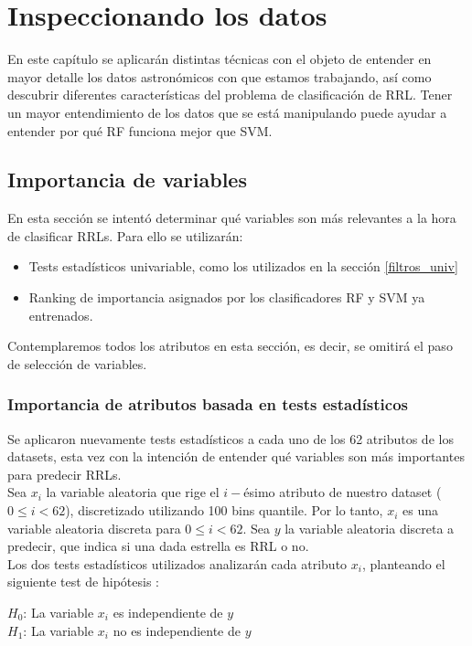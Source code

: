 \chapter{Inspeccionando los datos}
\label{inspeccionando}
En este capítulo se aplicarán distintas técnicas con el objeto de entender en mayor detalle los datos astronómicos con que estamos trabajando, así como descubrir diferentes características del problema de clasificación de RRL. Tener un mayor entendimiento de los datos que se está manipulando puede ayudar a entender por qué RF funciona mejor que SVM.

\section{Importancia de variables}

En esta sección se intentó determinar qué variables son más relevantes a la hora de clasificar RRLs. Para ello se utilizarán:
\begin{itemize}
\item Tests estadísticos univariable, como los utilizados en la sección \ref{filtros_univ}
\item Ranking de importancia asignados por los clasificadores RF y SVM ya entrenados.
\end{itemize} 

Contemplaremos todos los atributos en esta sección, es decir, se omitirá el paso de selección de variables.

\subsection{Importancia de atributos basada en tests estadísticos}
Se aplicaron nuevamente tests estadísticos a cada uno de los 62 atributos de los datasets, esta vez con la intención de entender qué variables son más importantes para predecir RRLs.\\

Sea $x_i$ la variable aleatoria que rige el $i-$ésimo atributo de nuestro dataset ($0 \leq i < 62$), discretizado utilizando 100 bins quantile. Por lo tanto, $x_i$ es una variable aleatoria discreta para $0 \leq i < 62$. Sea $y$ la variable aleatoria discreta a predecir, que indica si una dada estrella es RRL o no. \\

Los dos tests estadísticos utilizados analizarán cada atributo $x_i$, planteando el siguiente test de hipótesis \cite{meyer1970introductory}: \\
\begin{adjustwidth}{2cm}{}
\textbf{$H_0$}: La variable $x_i$ es independiente de $y$ \\
\textbf{$H_1$}: La variable $x_i$ no es independiente de $y$ \\
\end{adjustwidth}

